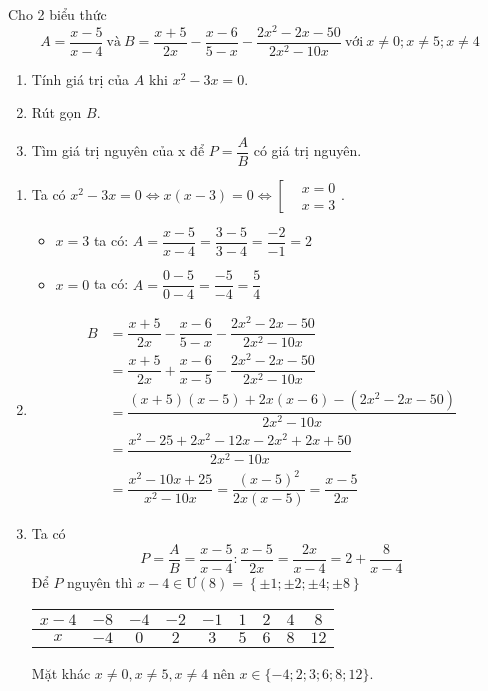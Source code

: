 \begin{ex}%
	Cho 2 biểu thức
	\[A=\dfrac{x-5}{x-4} ~ \text{và} ~ B = \dfrac{x+5}{2x} - \dfrac{x-6}{5-x} - \dfrac{2x^2-2x-50}{2x^2-10x} ~ \text{với} ~ x \neq 0; x \neq 5; x \neq 4\]
	\begin{enumerate}
		\item Tính giá trị của $A$ khi $x^{2} - 3x = 0$.
		\item Rút gọn $B$.
		\item Tìm giá trị nguyên của x để $P = \dfrac{A}{B}$ có giá trị nguyên.
	\end{enumerate}
	\loigiai
	{
	\begin{enumerate}
		\item Ta có $x^2-3x=0 \Leftrightarrow x(x-3)=0 \Leftrightarrow \left[\begin{aligned}
			&x=0 \\
			&x=3
		\end{aligned}\right.$.
			\begin{itemize}
				\item $x=3$ ta có:
				$A=\dfrac{x-5}{x-4}$$=\dfrac{3-5}{3-4}=\dfrac{-2}{-1}=2$
				\item $x=0$ ta có: $A=\dfrac{0-5}{0-4}$$=\dfrac{-5}{-4}=\dfrac{5}{4}$
			\end{itemize}
		\item
			\begin{align*}
				B &= \dfrac{x+5}{2x}-\dfrac{x-6}{5-x}-\dfrac{2x^{2}-2x-50}{2x^{2}-10x}\\
				&= \dfrac{x+5}{2x}+\dfrac{x-6}{x-5}-\dfrac{2x^{2}-2x-50}{2x^{2}-10x}\\
				&= \dfrac{(x+5)(x-5)+2x(x-6)-(2x^{2}-2x-50)}{2x^{2}-10x}\\
				&= \dfrac{x^{2}-25+2x^{2}-12x-2x^{2}+2x+50}{2x^{2}-10x}\\
				&= \dfrac{x^{2}-10x+25}{x^{2}-10x} = \dfrac{(x-5)^{2}}{2x(x-5)} = \dfrac{x-5}{2x}
			\end{align*}
		\item Ta có \[P = \dfrac{A}{B}=\dfrac{x-5}{x-4} : \dfrac{x-5}{2x} =\dfrac{2x}{x-4}
		=2+\dfrac{8}{x-4}\]
		Để $P$ nguyên thì $x-4 \in \text{Ư}(8) = \left\{\pm1;\pm2;\pm4;\pm8 \right\} $
		\begin{center}
		\begin{tabular}{|c|c|c|c|c|c|c|c|c|}
			\hline 
			$x-4$ & $-8$ &$-4$&$-2$&$-1$&$1$&$2$&$4$&$8$\\ 
			\hline 
			$x$ &$-4$&$0$&$2$&$3$&$5$&$6$&$8$&$12$\\
			\hline 
		\end{tabular}
		\end{center}
		Mặt khác $x\neq 0, x\neq5, x\neq4$ nên $x \in \{-4;2;3;6;8;12\}$.
	\end{enumerate}
}
\end{ex}
